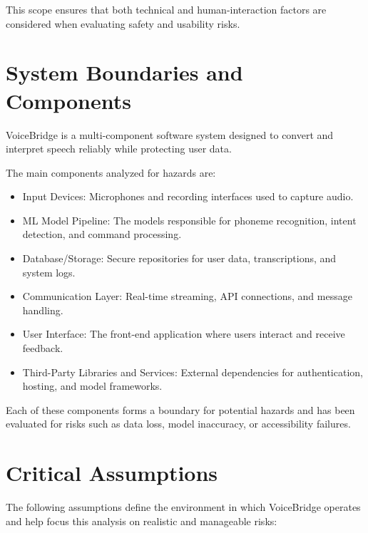 \documentclass{article}
\begin{document}
\noindent This scope ensures that both technical and human-interaction factors are considered when evaluating safety and usability risks.

\section{System Boundaries and Components}

VoiceBridge is a multi-component software system designed to convert and interpret speech reliably while protecting user data. 

\vspace{3mm}
\noindent The main components analyzed for hazards are:

\begin{itemize}
    \item Input Devices: Microphones and recording interfaces used to capture audio.
    \item ML Model Pipeline: The models responsible for phoneme recognition, intent detection, and command processing.
    \item Database/Storage: Secure repositories for user data, transcriptions, and system logs.
    \item Communication Layer: Real-time streaming, API connections, and message handling.
    \item User Interface: The front-end application where users interact and receive feedback.
    \item Third-Party Libraries and Services: External dependencies for authentication, hosting, and model frameworks.
\end{itemize}

\noindent Each of these components forms a boundary for potential hazards and has been evaluated for risks such as data loss, model inaccuracy, or accessibility failures.

\section{Critical Assumptions}

The following assumptions define the environment in which VoiceBridge operates and help focus this analysis on realistic and manageable risks:
\end{document}
